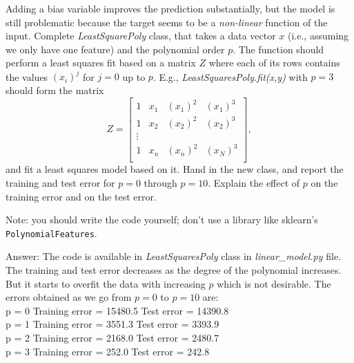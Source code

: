 \documentclass{article}
\def\blu#1{{\color{blu}#1}}
\begin{document}
Adding a bias variable improves the prediction substantially, but the model is still problematic because the target seems to be a \emph{non-linear} function of the input.
Complete \emph{LeastSquarePoly} class, that takes a data vector $x$ (i.e., assuming we only have one feature) and the polynomial order $p$. The function should perform a least squares fit based on a matrix $Z$ where each of its rows contains the values $(x_{i})^j$ for $j=0$ up to $p$. E.g., \emph{LeastSquaresPoly.fit(x,y)}  with $p = 3$ should form the matrix
\[
Z =
\left[\begin{array}{cccc}
1 & x_1 & (x_1)^2 & (x_1)^3\\
1 & x_2 & (x_2)^2 & (x_2)^3\\
\vdots\\
1 & x_n & (x_n)^2 & (x_N)^3\\
\end{array}
\right],
\]
and fit a least squares model based on it.
\blu{Hand in the new class, and report the training and test error for $p = 0$ through $p= 10$. Explain the effect of $p$ on the training error and on the test error.}

Note: you should write the code yourself; don't use a library like sklearn's \texttt{PolynomialFeatures}.

\blu{Answer:} The code is available in \emph{LeastSquaresPoly} class in \emph{linear\_model.py} file. The training and test error decreases as the degree of the polynomial increases. But it starts to overfit the data with increasing $p$ which is not desirable. The errors obtained as we go from $p = 0 $ to $p = 10 $ are: \\
\newline p = 0
\newline Training error = 15480.5
\newline Test error     = 14390.8 \\ 

p = 1
\newline Training error = 3551.3
\newline Test error     = 3393.9 \\ 

p = 2
\newline Training error = 2168.0
\newline Test error     = 2480.7 \\

p = 3
\newline Training error = 252.0
\newline Test error     = 242.8 \\
\end{document}
